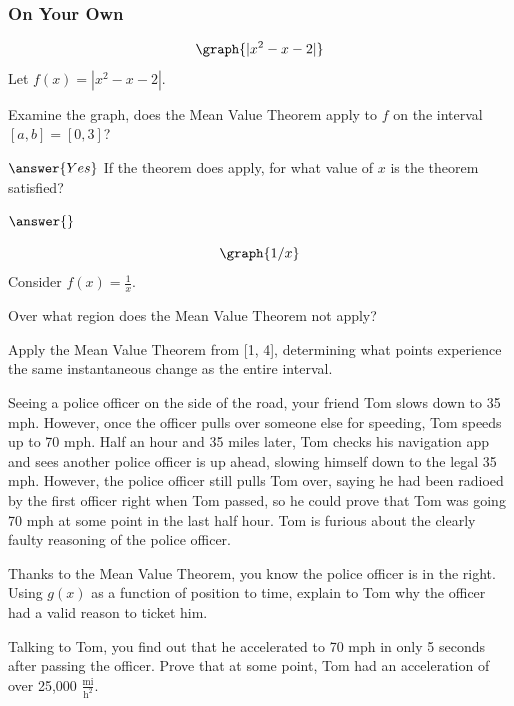 \documentclass{ximera}
\begin{document}
\subsubsection{On Your Own}
\[
\graph{|x^2-x-2|}
\]
Let $f(x)=\left|x^2-x-2\right|$.
\begin{question}
Examine the graph, does the Mean Value Theorem apply to $f$ on the interval $[a,b]=[0,3]$?

$\answer{Yes}$
If the theorem does apply, for what value of $x$ is the theorem satisfied?

$\answer{}$
\end{question}
\begin{question}
\[
\graph{1/x}
\]
Consider $f(x) = \frac{1}{x}$.

Over what region does the Mean Value Theorem not apply?

\begin{freeResponse}
\end{freeResponse}

Apply the Mean Value Theorem from [1, 4], determining what points experience the same instantaneous change as the entire interval.
\begin{freeResponse}
\end{freeResponse}
\end{question}
\begin{question}
Seeing a police officer on the side of the road, your friend Tom slows down to 35 mph. However, once the officer pulls over someone else for speeding, Tom speeds up to 70 mph. Half an hour and 35 miles later, Tom checks his navigation app and sees another police officer is up ahead, slowing himself down to the legal 35 mph. However, the police officer still pulls Tom over, saying he had been radioed by the first officer right when Tom passed, so he could prove that Tom was going 70 mph at some point in the last half hour. Tom is furious about the clearly faulty reasoning of the police officer.

Thanks to the Mean Value Theorem, you know the police officer is in the right. Using $g(x)$ as a function of position to time, explain to Tom why the officer had a valid reason to ticket him.

\begin{freeResponse}
\end{freeResponse}

Talking to Tom, you find out that he accelerated to 70 mph in only 5 seconds after passing the officer. Prove that at some point, Tom had an acceleration of over 25,000 $\frac{\text{mi}}{\text{h}^2}$.

\begin{freeResponse}
\end{freeResponse}
\end{question}
\end{document}
